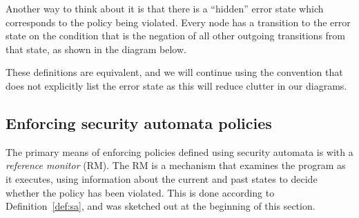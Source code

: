 \documentclass[11pt,twoside]{scrartcl}
\begin{document}
Another way to think about it is that there is a ``hidden'' error state which corresponds to the policy being violated. Every node has a transition to the error state on the condition that is the negation of all other outgoing transitions from that state, as shown in the diagram below.
\begin{center}
\end{center}
These definitions are equivalent, and we will continue using the convention that does not explicitly list the error state as this will reduce clutter in our diagrams.

\subsection{Enforcing security automata policies}

The primary means of enforcing policies defined using security automata is with a \emph{reference monitor} (RM). The RM is a mechanism that examines the program as it executes, using information about the current and past states to decide whether the policy has been violated. This is done according to Definition~\ref{def:sa}, and was sketched out at the beginning of this section.
\end{document}
